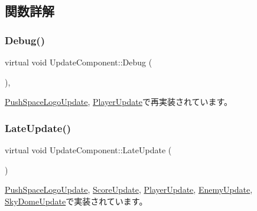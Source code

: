 \subsection{関数詳解}
\mbox{\label{class_update_component_a636b21061765a1101600c3ad70fadeac}} 
\subsubsection{\texorpdfstring{Debug()}{Debug()}}
{\footnotesize\ttfamily virtual void Update\+Component\+::\+Debug (\begin{DoxyParamCaption}{ }\end{DoxyParamCaption})\hspace{0.3cm}{\ttfamily [inline]}, {\ttfamily [virtual]}}



\mbox{\hyperlink{class_push_space_logo_update_ac61b14b1364b606771fc1080da041877}{Push\+Space\+Logo\+Update}}, \mbox{\hyperlink{class_player_update_a37e2d025997e1b60d6a02658b00dd503}{Player\+Update}}で再実装されています。

\mbox{\label{class_update_component_aecc61593be4d1feff2db4d9ff1f83f9f}} 
\subsubsection{\texorpdfstring{Late\+Update()}{LateUpdate()}}
{\footnotesize\ttfamily virtual void Update\+Component\+::\+Late\+Update (\begin{DoxyParamCaption}{ }\end{DoxyParamCaption})\hspace{0.3cm}{\ttfamily [pure virtual]}}



\mbox{\hyperlink{class_push_space_logo_update_a4423864fb22b1211e92a4317d0b70a44}{Push\+Space\+Logo\+Update}}, \mbox{\hyperlink{class_score_update_adc9a48f54828e49c072c298777935893}{Score\+Update}}, \mbox{\hyperlink{class_player_update_ae376f517f3458edfef61ac366aa78e36}{Player\+Update}}, \mbox{\hyperlink{class_enemy_update_ae14e4ebb42ad9043534e53edcba5b242}{Enemy\+Update}}, \mbox{\hyperlink{class_sky_dome_update_a94347cb50b4dc13528738a7b812da261}{Sky\+Dome\+Update}}で実装されています。

